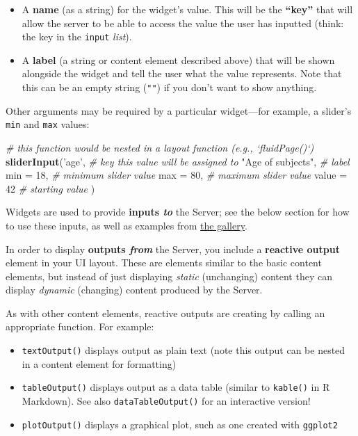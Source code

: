 \documentclass[]{book}
\newenvironment{Shaded}{\begin{snugshade}}{\end{snugshade}}
\newcommand{\KeywordTok}[1]{\textcolor[rgb]{0.13,0.29,0.53}{\textbf{#1}}}
\newcommand{\DataTypeTok}[1]{\textcolor[rgb]{0.13,0.29,0.53}{#1}}
\newcommand{\DecValTok}[1]{\textcolor[rgb]{0.00,0.00,0.81}{#1}}
\newcommand{\StringTok}[1]{\textcolor[rgb]{0.31,0.60,0.02}{#1}}
\newcommand{\CommentTok}[1]{\textcolor[rgb]{0.56,0.35,0.01}{\textit{#1}}}
\newcommand{\NormalTok}[1]{#1}
\providecommand{\tightlist}{%
  \setlength{\itemsep}{0pt}\setlength{\parskip}{0pt}}
\theoremstyle{definition}
\theoremstyle{definition}
\theoremstyle{remark}
\begin{document}
\begin{itemize}
\tightlist
\item
  A \textbf{name} (as a string) for the widget's value. This will be the
  \textbf{``key''} that will allow the server to be able to access the
  value the user has inputted (think: the key in the \texttt{input}
  \emph{list}).
\item
  A \textbf{label} (a string or content element described above) that
  will be shown alongside the widget and tell the user what the value
  represents. Note that this can be an empty string (\texttt{""}) if you
  don't want to show anything.
\end{itemize}

Other arguments may be required by a particular widget---for example, a
slider's \texttt{min} and \texttt{max} values:

\begin{Shaded}
\begin{Highlighting}[]
\CommentTok{# this function would be nested in a layout function (e.g., `fluidPage()`)}
\KeywordTok{sliderInput}\NormalTok{(}\StringTok{'age'}\NormalTok{,              }\CommentTok{# key this value will be assigned to}
            \StringTok{"Age of subjects"}\NormalTok{,  }\CommentTok{# label}
            \DataTypeTok{min =} \DecValTok{18}\NormalTok{,           }\CommentTok{# minimum slider value}
            \DataTypeTok{max =} \DecValTok{80}\NormalTok{,           }\CommentTok{# maximum slider value}
            \DataTypeTok{value =} \DecValTok{42}          \CommentTok{# starting value}
\NormalTok{           )}
\end{Highlighting}
\end{Shaded}

Widgets are used to provide \textbf{inputs \emph{to}} the Server; see
the below section for how to use these inputs, as well as examples from
\href{http://shiny.rstudio.com/gallery/}{the gallery}.

In order to display \textbf{outputs \emph{from}} the Server, you include
a \textbf{reactive output} element in your UI layout. These are elements
similar to the basic content elements, but instead of just displaying
\emph{static} (unchanging) content they can display \emph{dynamic}
(changing) content produced by the Server.

As with other content elements, reactive outputs are creating by calling
an appropriate function. For example:

\begin{itemize}
\tightlist
\item
  \texttt{textOutput()} displays output as plain text (note this output
  can be nested in a content element for formatting)
\item
  \texttt{tableOutput()} displays output as a data table (similar to
  \texttt{kable()} in R Markdown). See also \texttt{dataTableOutput()}
  for an interactive version!
\item
  \texttt{plotOutput()} displays a graphical plot, such as one created
  with \texttt{ggplot2}
\end{itemize}
\end{document}
